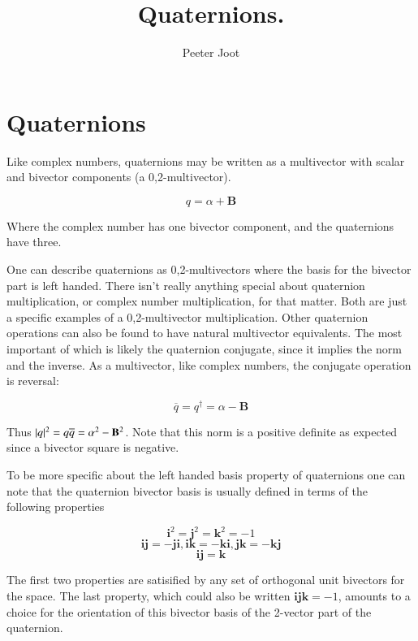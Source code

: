 \documentclass{article}      %
\title{Quaternions.} %
\author{Peeter Joot}         %
\begin{document}

\maketitle{}

\section{Quaternions}

Like complex numbers, quaternions may be written as a multivector with scalar and bivector components (a 0,2-multivector).

\[
q = \alpha + \mathbf{B}
\]

Where the complex number has one bivector component, and the quaternions have three.

One can describe quaternions as 0,2-multivectors where the basis for the bivector part is left handed.  There isn't really anything special about quaternion multiplication, or complex number multiplication, for that matter.  Both are just a specific examples of a 0,2-multivector multiplication.  Other quaternion operations can also be found to have natural multivector equivalents.  The most important of which is likely the quaternion conjugate, since it implies the norm and the inverse.  As a multivector, like complex numbers, the conjugate operation is reversal:

\[
\overline{q} = q^\dagger = \alpha - \mathbf{B}
\]

Thus $\lvert{q}\rvert^2 = q\overline{q} = \alpha^2 - \mathbf{B}^2$.  Note that this norm is a positive definite as expected since a bivector square is negative.

To be more specific about the left handed basis property of quaternions one can note that the quaternion bivector basis is usually defined in terms of the following properties

\[
\mathbf{i}^2 = \mathbf{j}^2 = \mathbf{k}^2 = -1
\]
\[
\mathbf{i}\mathbf{j} = -\mathbf{j}\mathbf{i}, \mathbf{i}\mathbf{k} = -\mathbf{k}\mathbf{i}, \mathbf{j}\mathbf{k} = -\mathbf{k}\mathbf{j}
\]
\[
\mathbf{i}\mathbf{j} = \mathbf{k}
\]

The first two properties are satisified by any set of orthogonal unit bivectors for the space.  The last property, which could also be written $\mathbf{i}\mathbf{j}\mathbf{k} = -1$, amounts to a choice for the orientation of this bivector basis of the 2-vector part of the quaternion.
\end{document}
